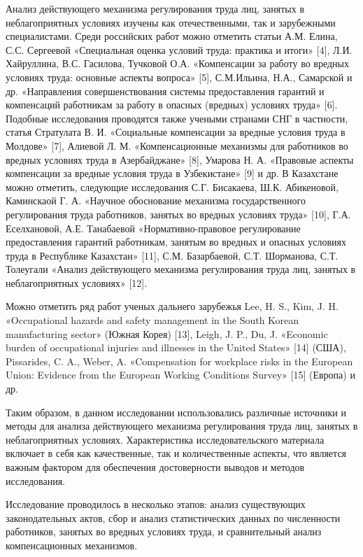 \begin{multicols}{2}
Анализ действующего механизма регулирования труда лиц, занятых в
неблагоприятных условиях изучены как отечественными, так и зарубежными
специалистами. Среди российских работ можно отметить статьи А.М. Елина,
С.С. Сергеевой «Специальная оценка условий труда: практика и итоги»
{[}4{]}, Л.И. Хайруллина, В.С. Гасилова, Тучковой О.А. «Компенсации за
работу во вредных условиях труда: основные аспекты вопроса» {[}5{]},
С.М.Ильина, Н.А., Самарской и др. «Направления совершенствования системы
предоставления гарантий и компенсаций работникам за работу в опасных
(вредных) условиях труда» {[}6{]}. Подобные исследования проводятся
также учеными странами СНГ в частности, статья Стратулата В. И.
«Социальные компенсации за вредные условия труда в Молдове» {[}7{]},
Алиевой Л. М. «Компенсационные механизмы для работников во вредных
условиях труда в Азербайджане» {[}8{]}, Умарова Н. А. «Правовые аспекты
компенсации за вредные условия труда в Узбекистане» {[}9{]} и др. В
Казахстане можно отметить, следующие исследования С.Г. Бисакаева, Ш.К.
Абикеновой, Каминскаой Г. А. «Научное обоснование механизма
государственного регулирования труда работников, занятых во вредных
условиях труда» {[}10{]}, Г.А. Еселхановой, А.Е. Танабаевой
«Нормативно-правовое регулирование предоставления гарантий работникам,
занятым во вредных и опасных условиях труда в Республике Казахстан»
{[}11{]}, С.М. Базарбаевой, С.Т. Шорманова, С.Т. Толеугали «Анализ
действующего механизма регулирования труда лиц, занятых в
неблагоприятных условиях» {[}12{]}.

Можно отметить ряд работ ученых дальнего зарубежья Lee, H. S., Kim, J.
H. «Occupational hazards and safety management in the South Korean
manufacturing sector» (Южная Корея) {[}13{]}, Leigh, J. P., Du, J.
«Economic burden of occupational injuries and illnesses in the United
States» {[}14{]} (США), Pissarides, C. A., Weber, A. «Compensation for
workplace risks in the European Union: Evidence from the European
Working Conditions Survey» {[}15{]} (Европа) и др.

Таким образом, в данном исследовании использовались различные источники
и методы для анализа действующего механизма регулирования труда лиц,
занятых в неблагоприятных условиях. Характеристика исследовательского
материала включает в себя как качественные, так и количественные
аспекты, что является важным фактором для обеспечения достоверности
выводов и методов исследования.

Исследование проводилось в несколько этапов: анализ существующих
законодательных актов, сбор и анализ статистических данных по
численности работников, занятых во вредных условиях труда, и
сравнительный анализ компенсационных механизмов.


\end{multicols}
